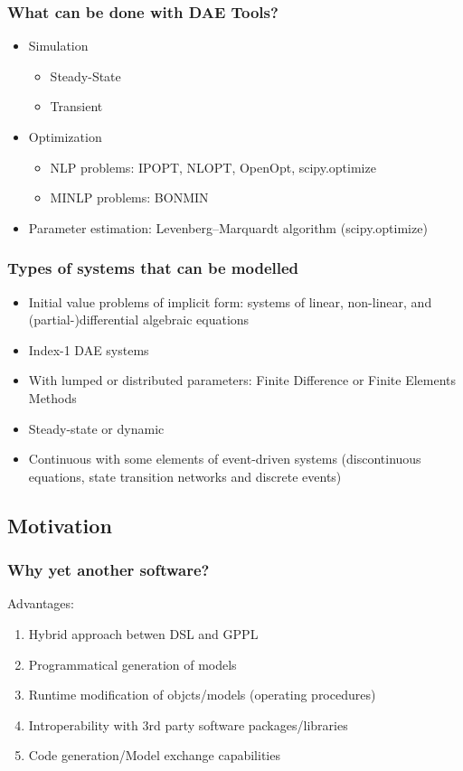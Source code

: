 \documentclass{beamer}
\begin{document}
\begin{frame}
\frametitle{What can be done with DAE Tools?} 
\begin{block}{}
\begin{itemize}
  \item Simulation
    \begin{itemize}
      \item Steady-State 
      \item Transient
    \end{itemize}
  \item Optimization
    \begin{itemize}
      \item NLP problems: IPOPT, NLOPT, OpenOpt, scipy.optimize
      \item MINLP problems: BONMIN
    \end{itemize}
  \item Parameter estimation: Levenberg–Marquardt algorithm (scipy.optimize)
\end{itemize}
\end{block}
\end{frame}

\begin{frame}
\frametitle{Types of systems that can be modelled}
\begin{block}{}
\begin{itemize}
  \item Initial value problems of implicit form: systems of linear, non-linear, and (partial-)differential algebraic equations
  \item Index-1 DAE systems
  \item With lumped or distributed parameters: Finite Difference or Finite Elements Methods
  \item Steady-state or dynamic
  \item Continuous with some elements of event-driven systems (discontinuous equations, state transition networks and discrete events) 
\end{itemize}
\end{block}
\end{frame}

\subsection{Motivation}
\begin{frame}
\frametitle{Why yet another software?}
\begin{block}{}
Advantages:
\begin{enumerate}
  \item Hybrid approach betwen DSL and GPPL
  \item Programmatical generation of models
  \item Runtime modification of objcts/models (operating procedures)
  \item Introperability with 3rd party software packages/libraries
  \item Code generation/Model exchange capabilities
\end{enumerate}
\end{block}
\end{frame}
\end{document}
